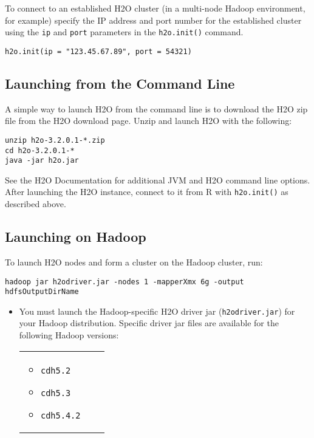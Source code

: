 {To connect to an established H2O cluster (in a multi-node Hadoop environment, for example) specify the IP address and port number for the established cluster using the \texttt{ip} and \texttt{port} parameters in the \texttt{h2o.init()} command. 
\medskip  

\begin{lstlisting}[style=R]
h2o.init(ip = "123.45.67.89", port = 54321)
\end{lstlisting}

\subsection{Launching from the Command Line}

A simple way to launch H2O from the command line is to download the H2O zip file from the H2O download page. Unzip and
launch H2O with the following:
\begin{lstlisting}[style=R]
unzip h2o-3.2.0.1-*.zip
cd h2o-3.2.0.1-*
java -jar h2o.jar
\end{lstlisting}
See the H2O Documentation for additional JVM and H2O command line options.
After launching the H2O instance, connect to it from R with {\texttt{h2o.init()}} as described above.

\subsection{Launching on Hadoop}

To launch H2O nodes and form a cluster on the Hadoop cluster, run:

\begin{lstlisting}[style=R]
hadoop jar h2odriver.jar -nodes 1 -mapperXmx 6g -output hdfsOutputDirName
\end{lstlisting}

\begin{itemize}
\item You must launch the Hadoop-specific H2O driver jar (\texttt{h2odriver.jar}) for your Hadoop distribution. Specific driver jar files are available for the following Hadoop versions:

\begin{frame}%

\begin{tabular}{p{3cm}p{3cm}p{3cm}}

\begin{itemize}
     \item \texttt{cdh5.2}
     \item \texttt{cdh5.3}
     \item \texttt{cdh5.4.2}
  \end{itemize} &


\end{tabular}
\end{frame}
\end{itemize}}
